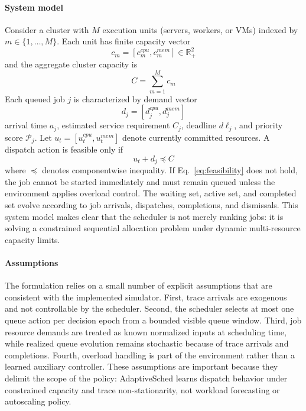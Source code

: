 \documentclass[journal]{IEEEtran}
\begin{document}
\paragraph{System model}
Consider a cluster with $M$ execution units (servers, workers, or VMs) indexed by $m \in \{1,\dots,M\}$. Each unit has finite capacity vector
\begin{equation}
c_m = \left[c_m^{cpu}, c_m^{mem}\right] \in \mathbb{R}_{+}^{2}
\end{equation}
and the aggregate cluster capacity is
\begin{equation}
C = \sum_{m=1}^{M} c_m
\end{equation}
Each queued job $j$ is characterized by demand vector
\begin{equation}
d_j = \left[d_j^{cpu}, d_j^{mem}\right]
\end{equation}
arrival time $a_j$, estimated service requirement $C_j$, deadline $d\ell_j$, and priority score $\mathcal{P}_j$. Let $u_t=[u_t^{cpu},u_t^{mem}]$ denote currently committed resources. A dispatch action is feasible only if
\begin{equation}
u_t + d_j \preceq C
\label{eq:feasibility}
\end{equation}
where $\preceq$ denotes componentwise inequality. If Eq.~\eqref{eq:feasibility} does not hold, the job cannot be started immediately and must remain queued unless the environment applies overload control. The waiting set, active set, and completed set evolve according to job arrivals, dispatches, completions, and dismissals. This system model makes clear that the scheduler is not merely ranking jobs: it is solving a constrained sequential allocation problem under dynamic multi-resource capacity limits.

\paragraph{Assumptions}
The formulation relies on a small number of explicit assumptions that are consistent with the implemented simulator. First, trace arrivals are exogenous and not controllable by the scheduler. Second, the scheduler selects at most one queue action per decision epoch from a bounded visible queue window. Third, job resource demands are treated as known normalized inputs at scheduling time, while realized queue evolution remains stochastic because of trace arrivals and completions. Fourth, overload handling is part of the environment rather than a learned auxiliary controller. These assumptions are important because they delimit the scope of the policy: AdaptiveSched learns dispatch behavior under constrained capacity and trace non-stationarity, not workload forecasting or autoscaling policy.
\end{document}
